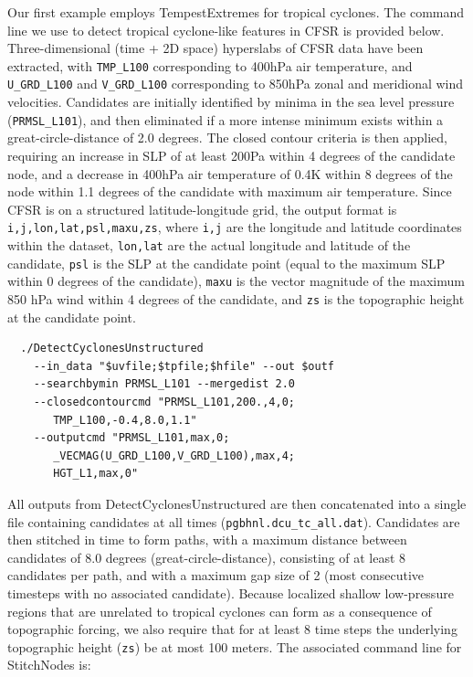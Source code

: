 \documentclass[gmdd, hvmath, online]{copernicus_discussions}
\begin{document}
Our first example employs TempestExtremes for tropical cyclones.  The command line we use to detect tropical cyclone-like features in CFSR is provided below.  Three-dimensional (time + 2D space) hyperslabs of CFSR data have been extracted, with \texttt{TMP\_L100} corresponding to 400hPa air temperature, and \texttt{U\_GRD\_L100} and \texttt{V\_GRD\_L100} corresponding to 850hPa zonal and meridional wind velocities.  Candidates are initially identified by minima in the sea level pressure (\texttt{PRMSL\_L101}), and then eliminated if a more intense minimum exists within a great-circle-distance of 2.0 degrees.  The closed contour criteria is then applied, requiring an increase in SLP of at least 200Pa within 4 degrees of the candidate node, and a decrease in 400hPa air temperature of 0.4K within 8 degrees of the node within 1.1 degrees of the candidate with maximum air temperature.  Since CFSR is on a structured latitude-longitude grid, the output format is \texttt{i,j,lon,lat,psl,maxu,zs}, where \texttt{i,j} are the longitude and latitude coordinates within the dataset, \texttt{lon,lat} are the actual longitude and latitude of the candidate, \texttt{psl} is the SLP at the candidate point (equal to the maximum SLP within 0 degrees of the candidate), \texttt{maxu} is the vector magnitude of the maximum 850 hPa wind within 4 degrees of the candidate, and \texttt{zs} is the topographic height at the candidate point.

{\small \begin{verbatim}
  ./DetectCyclonesUnstructured
    --in_data "$uvfile;$tpfile;$hfile" --out $outf
    --searchbymin PRMSL_L101 --mergedist 2.0
    --closedcontourcmd "PRMSL_L101,200.,4,0;
       TMP_L100,-0.4,8.0,1.1"
    --outputcmd "PRMSL_L101,max,0;
       _VECMAG(U_GRD_L100,V_GRD_L100),max,4;
       HGT_L1,max,0"
\end{verbatim}}

All outputs from DetectCyclonesUnstructured are then concatenated into a single file containing candidates at all times (\texttt{pgbhnl.dcu\_tc\_all.dat}).  Candidates are then stitched in time to form paths, with a maximum distance between candidates of 8.0 degrees (great-circle-distance), consisting of at least 8 candidates per path, and with a maximum gap size of 2 (most consecutive timesteps with no associated candidate).  Because localized shallow low-pressure regions that are unrelated to tropical cyclones can form as a consequence of topographic forcing, we also require that for at least 8 time steps the underlying topographic height (\texttt{zs}) be at most 100 meters.  The associated command line for StitchNodes is:
\end{document}
